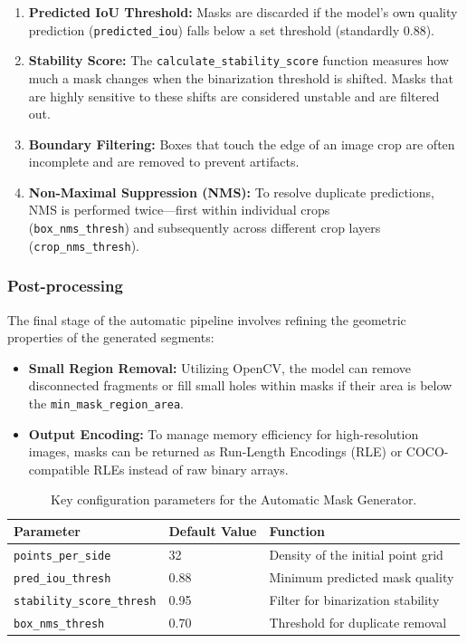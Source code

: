 \begin{enumerate}
	\item \textbf{Predicted IoU Threshold:} Masks are discarded if the model's own quality prediction (\texttt{predicted\_iou}) falls below a set threshold (standardly 0.88).
	
	\item \textbf{Stability Score:} The \texttt{calculate\_stability\_score} function measures how much a mask changes when the binarization threshold is shifted. Masks that are highly sensitive to these shifts are considered unstable and are filtered out.
	
	\item \textbf{Boundary Filtering:} Boxes that touch the edge of an image crop are often incomplete and are removed to prevent artifacts.
	
	\item \textbf{Non-Maximal Suppression (NMS):} To resolve duplicate predictions, NMS is performed twice—first within individual crops\\ (\texttt{box\_nms\_thresh}) and subsequently across different crop layers\\ (\texttt{crop\_nms\_thresh}).
\end{enumerate}

\subsubsection{Post-processing}
The final stage of the automatic pipeline involves refining the geometric properties of the generated segments:

\begin{itemize}
	\item \textbf{Small Region Removal:} Utilizing OpenCV, the model can remove disconnected fragments or fill small holes within masks if their area is below the \texttt{min\_mask\_region\_area}.
	
	\item \textbf{Output Encoding:} To manage memory efficiency for high-resolution images, masks can be returned as Run-Length Encodings (RLE) or COCO-compatible RLEs instead of raw binary arrays.
\end{itemize}

\begin{table}[H]
	\centering
	\begin{tabular}{|l|l|l|}
		\hline
		\textbf{Parameter} & \textbf{Default Value} & \textbf{Function} \\ \hline
		\texttt{points\_per\_side} & 32 & Density of the initial point grid \\ \hline
		\texttt{pred\_iou\_thresh} & 0.88 & Minimum predicted mask quality \\ \hline
		\texttt{stability\_score\_thresh} & 0.95 & Filter for binarization stability \\ \hline
		\texttt{box\_nms\_thresh} & 0.70 & Threshold for duplicate removal \\ \hline
	\end{tabular}
	\caption{Key configuration parameters for the Automatic Mask Generator.}
\end{table}